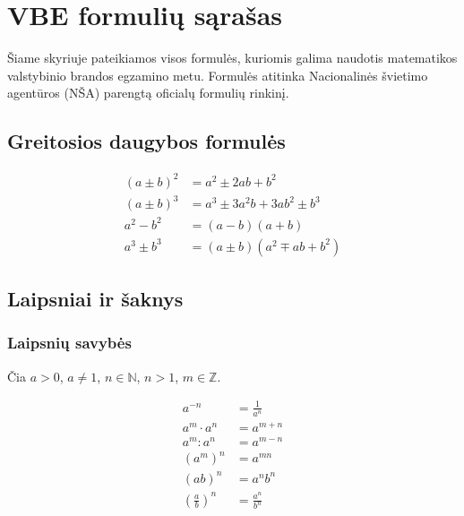 \chapter{VBE formulių sąrašas}

Šiame skyriuje pateikiamos visos formulės, kuriomis galima naudotis matematikos
valstybinio brandos egzamino metu. Formulės atitinka Nacionalinės švietimo agentūros
(NŠA) parengtą oficialų formulių rinkinį.

\section{Greitosios daugybos formulės}

\begin{tcolorbox}[colback=blue!5!white, colframe=blue!60!black, title=Greitosios daugybos formulės]
\begin{align}
(a \pm b)^2 &= a^2 \pm 2ab + b^2 \\[6pt]
(a \pm b)^3 &= a^3 \pm 3a^2b + 3ab^2 \pm b^3 \\[6pt]
a^2 - b^2   &= (a-b)(a+b) \\[6pt]
a^3 \pm b^3 &= (a \pm b)(a^2 \mp ab + b^2)
\end{align}
\end{tcolorbox}

\section{Laipsniai ir šaknys}

\subsection{Laipsnių savybės}

Čia $a > 0$, $a \neq 1$, $n \in \mathbb{N}$, $n > 1$, $m \in \mathbb{Z}$.

\begin{align}
a^{-n}        &= \frac{1}{a^n} \\[6pt]
a^m \cdot a^n &= a^{m+n} \\[6pt]
a^m : a^n     &= a^{m-n} \\[6pt]
(a^m)^n       &= a^{mn} \\[6pt]
(ab)^n        &= a^n b^n \\[6pt]
\left(\frac{a}{b}\right)^n &= \frac{a^n}{b^n}
\end{align}

